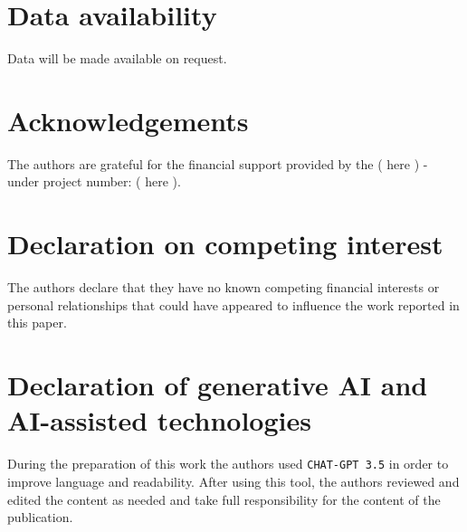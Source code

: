 \documentclass[12pt]{article}
\begin{document}
\section*{Data availability}

\noindent Data will be made available on request.

\section*{Acknowledgements}

\noindent The authors are grateful for the financial support provided by the ( here ) - under project number: ( here ).

\section*{Declaration on competing interest}

\noindent The authors declare that they have no known competing financial interests or personal relationships that could have appeared to influence the work reported in this paper.

\section*{Declaration of generative AI and AI-assisted technologies}

\noindent During the preparation of this work the authors used \texttt{CHAT-GPT 3.5} in order to improve language and readability. After using this tool, the authors reviewed and edited the content as needed and take full responsibility for the content of the publication.
	
\end{document}
